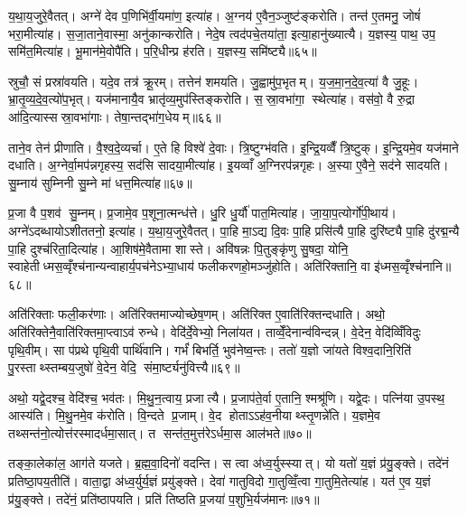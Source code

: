 य॒था॒य॒जुरे॒वैतत्। अग्ने॑ देव प॒णिभि॑र्वी॒यमा॑ण॒ इत्या॑ह। अ॒ग्नय॑ ए॒वैन॒ञ्जुष्ट॑ङ्करोति। तन्त॑ ए॒तमनु॒ जोषं॑ भरा॒मीत्या॑ह। स॒जा॒ताने॒वास्मा॒ अनु॑कान्करोति। नेदे॒ष त्वद॑पचे॒तया॑ता॒ इत्या॒हानु॑ख्यात्यै। य॒ज्ञस्य॒ पाथ॒ उप॒ समि॑त॒मित्या॑ह। भू॒मान॑मे॒वोपै॑ति। प॒रि॒धीन्प्र ह॑रति। य॒ज्ञस्य॒ समि॑ष्ट्यै॥६५॥

स्रुचौ॒ सं प्रस्रा॑वयति। यदे॒व तत्र॑ क्रू॒रम्। तत्तेन॑ शमयति। जु॒ह्वामु॑प॒भृतम्। य॒ज॒मा॒न॒दे॒व॒त्या॑ वै जु॒हूः। भ्रा॒तृ॒व्य॒दे॒व॒त्यो॑प॒भृत्। यज॑मानायै॒व भ्रातृ॑व्य॒मुप॑स्तिङ्करोति। स॒स्रा॒वभा॑गा॒ स्थेत्या॑ह। वस॑वो॒ वै रु॒द्रा आ॑दि॒त्यास्सस्रा॒वभा॑गाः। तेषा॒न्तद्भा॑ग॒धेयम्॥६६॥

ताने॒व तेन॑ प्रीणाति। वै॒श्व॒दे॒व्यर्चा। ए॒ते हि विश्वे॑ दे॒वाः। त्रि॒ष्टुग्भ॑वति। इ॒न्द्रि॒यव्वैँ त्रि॒ष्टुक्। इ॒न्द्रि॒यमे॒व यज॑माने दधाति। अ॒ग्नेर्वा॒मप॑न्नगृहस्य॒ सद॑सि सादया॒मीत्या॑ह। इ॒यव्वाँ अ॒ग्निरप॑न्नगृहः। अ॒स्या ए॒वैने॒ सद॑ने सादयति। सु॒म्नाय॑ सुम्निनी सु॒म्ने मा॑ धत्त॒मित्या॑ह॥६७॥

प्र॒जा वै प॒शव॑ सु॒म्नम्। प्र॒जामे॒व प॒शूना॒त्मन्ध॑त्ते। धु॒रि धु॒र्यौ॑ पात॒मित्या॑ह। जा॒या॒प॒त्योर्गो॑पी॒थाय॑। अग्ने॑ऽदब्धायोऽशीततनो॒ इत्या॑ह। य॒था॒य॒जुरे॒वैतत्। पा॒हि मा॒ऽद्य दि॒वः पा॒हि प्रसि॑त्यै पा॒हि दुरि॑ष्ट्यै पा॒हि दु॑रद्म॒न्यै पा॒हि दुश्च॑रिता॒दित्या॑ह। आ॒शिष॑मे॒वैतामा शास्ते। अवि॑षन्नः पि॒तुङ्कृ॑णु सु॒षदा॒ योनि॒ स्वाहेतीध्मस॒व्वृँश्च॑नान्यन्वाहार्य॒पच॑नेऽभ्या॒धाय॑ फलीकरणहो॒मञ्जु॑होति। अति॑रिक्तानि॒ वा इ॑ध्मस॒व्वृँश्च॑नानि॥६८॥

अति॑रिक्ताः फली॒कर॑णाः। अति॑रिक्तमाज्योच्छेष॒णम्। अति॑रिक्त ए॒वाति॑रिक्तन्दधाति। अथो॒ अति॑रिक्तेनै॒वाति॑रिक्तमा॒प्त्वाऽव॑ रुन्धे। वेदि॑र्दे॒वेभ्यो॒ निला॑यत। ताव्वेँ॒देनान्व॑विन्दन्न्। वे॒देन॒ वेदि॑व्विँविदुः पृथि॒वीम्। सा प॑प्रथे पृथि॒वी पार्थि॑वानि। गर्भं॑ बिभर्ति॒ भुव॑नेष्व॒न्तः। ततो॑ य॒ज्ञो जा॑यते विश्व॒दानि॒रिति॑ पु॒रस्ताथ्स्तम्बय॒जुषो॑ वे॒देन॒ वेदि॒ संमा॒र्ष्ट्यनु॑वित्त्यै॥६९॥

अथो॒ यद्वे॒दश्च॒ वेदि॑श्च॒ भव॑तः। मि॒थु॒न॒त्वाय॒ प्रजात्यै। प्र॒जाप॑ते॒र्वा ए॒तानि॒ श्मश्रू॑णि। यद्वे॒दः। पत्नि॑या उ॒पस्थ॒ आस्य॑ति। मि॒थु॒नमे॒व क॑रोति। वि॒न्दते प्र॒जाम्। वे॒द होताऽऽह॑व॒नीयाथ्स्तृ॒णन्ने॑ति। य॒ज्ञमे॒व तथ्सन्त॑नो॒त्योत्त॑रस्मादर्धमा॒सात्। त सन्त॑त॒मुत्त॑रेऽर्धमा॒स आल॑भते॥७०॥

तङ्का॒लेका॑ल॒ आग॑ते यजते। ब्र॒ह्म॒वा॒दिनो॑ वदन्ति। स त्वा अ॑ध्व॒र्युस्स्यात्। यो यतो॑ य॒ज्ञं प्र॑यु॒ङ्क्ते। तदे॑नं प्रतिष्ठा॒पय॒तीति॑। वाता॒द्वा अ॑ध्व॒र्युर्य॒ज्ञं प्रयु॑ङ्क्ते। देवा॑ गातुविदो गा॒तुव्विँ॒त्वा गा॒तुमि॒तेत्या॑ह। यत॑ ए॒व य॒ज्ञं प्र॑यु॒ङ्क्ते। तदे॑नं॒ प्रति॑ष्ठापयति। प्रति॑ तिष्ठति प्र॒जया॑ प॒शुभि॒र्यज॑मानः॥७१॥

